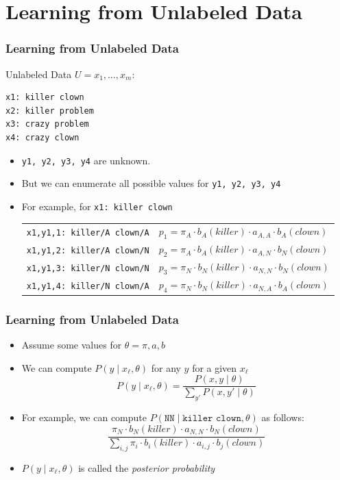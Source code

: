 \section{Learning from Unlabeled Data}

\begin{frame}[fragile]
\frametitle{Learning from Unlabeled Data}
\begin{block}{Unlabeled Data $U = x_1, \ldots, x_m$:}
\begin{verbatim}
x1: killer clown
x2: killer problem
x3: crazy problem
x4: crazy clown
\end{verbatim}
\end{block}

\begin{itemize}[<+->]
\item {\tt y1, y2, y3, y4} are unknown.
\item But we can enumerate all possible values for {\tt y1, y2, y3, y4}
\item For example, for {\tt x1: killer clown}
{\small\begin{tabular}{ll}
\pause
{\tt x1,y1,1: killer/A clown/A} & $p_1 = \pi_A \cdot b_A(\textit{killer}) \cdot a_{A,A} \cdot b_A(\textit{clown})$ \\
\pause
{\tt x1,y1,2: killer/A clown/N} & $p_2 = \pi_A \cdot b_A(\textit{killer}) \cdot a_{A,N} \cdot b_N(\textit{clown})$\\
\pause
{\tt x1,y1,3: killer/N clown/N} & $p_3 = \pi_N \cdot b_N(\textit{killer}) \cdot a_{N,N} \cdot b_N(\textit{clown})$\\
\pause
{\tt x1,y1,4: killer/N clown/A} & $p_4 = \pi_N \cdot b_N(\textit{killer}) \cdot a_{N,A} \cdot b_A(\textit{clown})$
\end{tabular}}
\end{itemize}
\end{frame}


\begin{frame}
\frametitle{Learning from Unlabeled Data}
\begin{itemize}[<+->]
\item Assume some values for $\theta = \pi, a, b$
\item We can compute $P(y \mid x_\ell, \theta)$ for any $y$ for a given $x_\ell$
\[ P(y \mid x_\ell, \theta) = \frac{ P(x, y \mid \theta) }{ \sum_{y'} P(x, y' \mid \theta) } \]
\item For example, we can compute $P( \texttt{NN} \mid \texttt{killer clown}, \theta)$ as follows:
\[ \frac{ \pi_N \cdot b_N(\textit{killer}) \cdot a_{N,N} \cdot b_N(\textit{clown}) }
{ \sum_{i,j} \pi_i \cdot b_i(\textit{killer}) \cdot a_{i,j} \cdot b_j(\textit{clown}) } \]
\item $P(y \mid x_\ell, \theta)$ is called the \emph{posterior probability}
\end{itemize}
\end{frame}


